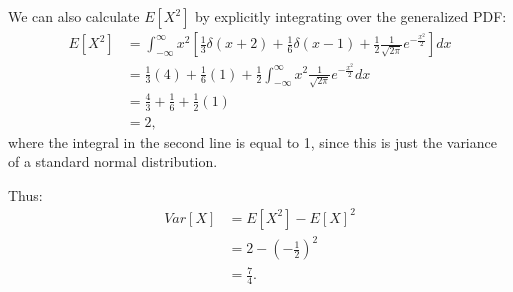 \begin{problem}{15}
\begin{enumerate}
We can also calculate $E[X^2]$ by explicitly integrating over the generalized PDF:
\begin{align*}
E[X^2] & = \int_{-\infty}^{\infty} x^2 \left [ \frac{1}{3}\delta(x+2) +\frac{1}{6}\delta(x-1)+\frac{1}{2}\frac{1}{\sqrt{2 \pi}}e^{-\frac{x^2}{2}} \right] dx\\
& = \frac{1}{3}(4)+\frac{1}{6}(1)+\frac{1}{2}\int_{-\infty}^{\infty} x^2 \frac{1}{\sqrt{2 \pi}}e^{-\frac{x^2}{2}} dx \\
& = \frac{4}{3} +\frac{1}{6}+\frac{1}{2}(1) \\
& =2,
\end{align*}
where the integral in the second line is equal to 1, since this is just the variance of a standard normal distribution.

Thus:
\begin{align*}
Var[X]&=E[X^2] - E[X]^2 \\
& = 2 - \left(-\frac{1}{2}\right)^2 \\
& = \frac{7}{4}.
\end{align*}

\end{enumerate}



\end{problem}


